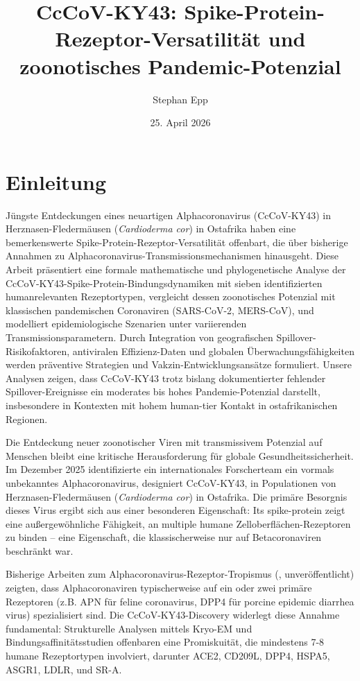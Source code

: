 ﻿\documentclass[11pt,a4paper]{article}
\title{\Large \textbf{CcCoV-KY43: Spike-Protein-Rezeptor-Versatilität und zoonotisches Pandemic-Potenzial}}
\author{Stephan Epp}
\date{25. April 2026}
\theoremstyle{definition}
\begin{document}
\maketitle
\tableofcontents
\newpage

\section{Einleitung}
Jüngste Entdeckungen eines neuartigen Alphacoronavirus (CcCoV-KY43) in Herznasen-Fleder\-mäusen (\textit{Cardioderma cor}) in Ostafrika haben eine bemerkenswerte Spike-Protein-Rezeptor-Versatilität offenbart, die über bisherige Annahmen zu Alphacoronavirus-Transmissionsmechanis\-men hinausgeht. Diese Arbeit präsentiert eine formale mathematische und phylogenetische Analyse der CcCoV-KY43-Spike-Protein-Bindungsdynamiken mit sieben identifizierten humanrelevanten Rezeptortypen, vergleicht dessen zoonotisches Potenzial mit klassischen pandemischen Coronaviren (SARS-CoV-2, MERS-CoV), und modelliert epidemiologische Szenarien unter variierenden Transmissionsparametern. Durch Integration von geografischen Spillover-Risikofaktoren, antiviralen Effizienz-Daten und globalen Überwachungsfähigkeiten werden präventive Strategien und Vakzin-Entwicklungsansätze formuliert. Unsere Analysen zeigen, dass CcCoV-KY43 trotz bislang dokumentierter fehlender Spillover-Ereignisse ein moderates bis hohes Pandemie-Potenzial darstellt, insbesondere in Kontexten mit hohem human-tier Kontakt in ostafrikanischen Regionen.

Die Entdeckung neuer zoonotischer Viren mit transmissivem Potenzial auf Menschen bleibt eine kritische Herausforderung für globale Gesundheitssicherheit. Im Dezember 2025 identifizierte ein internationales Forscherteam ein vormals unbekanntes Alphacoronavirus, designiert CcCoV-KY43, in Populationen von Herznasen-Fledermäusen (\textit{Cardioderma cor}) in Ostafrika. Die primäre Besorgnis dieses Virus ergibt sich aus einer besonderen Eigenschaft: Its spike-protein zeigt eine außergewöhnliche Fähigkeit, an multiple humane Zelloberflächen-Rezeptoren zu binden -- eine Eigenschaft, die klassischerweise nur auf Betacoronaviren beschränkt war.

Bisherige Arbeiten zum Alphacoronavirus-Rezeptor-Tropismus (\cite{bailey2024receptors}, unveröffentlicht) zeigten, dass Alphacoronaviren typischerweise auf ein oder zwei primäre Rezeptoren (z.B. APN für feline coronavirus, DPP4 für porcine epidemic diarrhea virus) spezialisiert sind. Die CcCoV-KY43-Discovery widerlegt diese Annahme fundamental: Strukturelle Analysen mittels Kryo-EM und Bindungsaffinitätsstudien offenbaren eine Promiskuität, die mindestens 7-8 humane Rezeptortypen involviert, darunter ACE2, CD209L, DPP4, HSPA5, ASGR1, LDLR, und SR-A.
\end{document}
